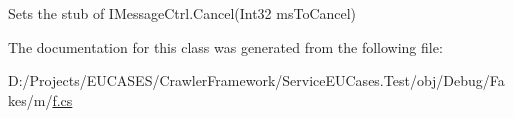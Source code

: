 Sets the stub of I\-Message\-Ctrl.\-Cancel(\-Int32 ms\-To\-Cancel)



The documentation for this class was generated from the following file\-:\begin{DoxyCompactItemize}
\item 
D\-:/\-Projects/\-E\-U\-C\-A\-S\-E\-S/\-Crawler\-Framework/\-Service\-E\-U\-Cases.\-Test/obj/\-Debug/\-Fakes/m/\hyperlink{m_2f_8cs}{f.\-cs}\end{DoxyCompactItemize}

